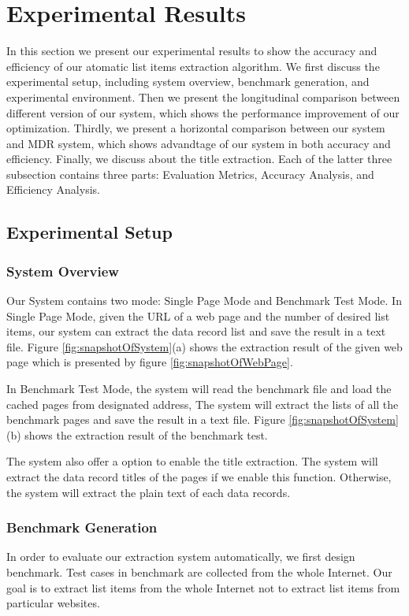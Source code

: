 \section{Experimental Results}
\label{sec:eval}

In this section we present our experimental results 
to show the accuracy and efficiency 
of our atomatic list items extraction algorithm. 
We first discuss the experimental setup,
including system overview, benchmark generation,
and experimental environment.
Then we present the longitudinal comparison between different version of our system,
which shows the performance improvement of our optimization.
Thirdly, we present a horizontal comparison 
between our system and MDR \cite{LiuGZ03:MDR} system,
which shows advandtage of our system in both accuracy and efficiency. 
Finally, we discuss about the title extraction.
Each of the latter three subsection contains three parts:
Evaluation Metrics,
Accuracy Analysis,
and Efficiency Analysis.

\subsection{Experimental Setup}
\subsubsection{System Overview}
Our System contains two mode:
Single Page Mode and Benchmark Test Mode.
In Single Page Mode,
given the URL of a web page and the number of desired list items, 
our system can extract the data record list and save the result in a text file. 
Figure \ref{fig:snapshotOfSystem}(a) shows the extraction result 
of the given web page 
which is presented by figure \ref{fig:snapshotOfWebPage}. 

In Benchmark Test Mode,
the system will read the benchmark file and load the cached pages 
from designated address,
The system will extract the lists of all the benchmark pages and save the result in a text file. 
Figure \ref{fig:snapshotOfSystem}(b) shows the extraction result 
of the benchmark test.

The system also offer a option to enable the title extraction.
The system will extract the data record titles of the pages if we enable this function.
Otherwise, the system will extract the plain text of each data records.


\subsubsection{Benchmark Generation}
In order to evaluate our extraction system automatically, we first design benchmark. Test cases in benchmark are collected from the whole Internet. Our goal is to extract list items from the whole Internet not to extract list items from particular websites.

